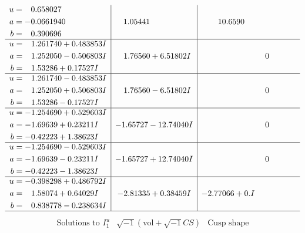 \documentclass[1p]{elsarticle_modified}
\theoremstyle{definition}
\newcommand{\I}{\sqrt{-1}}
\begin{document}
$$\begin{array}{c|c|c}
\begin{aligned}
u &= \phantom{-}0.658027\phantom{ +0.000000I} \\
a &= -0.0661940\phantom{ +0.000000I} \\
b &= \phantom{-}0.390696\phantom{ +0.000000I}\end{aligned}
 & \phantom{-}1.05441\phantom{ +0.000000I} & \phantom{-}10.6590\phantom{ +0.000000I} \\ \hline\begin{aligned}
u &= \phantom{-}1.261740 + 0.483853 I \\
a &= \phantom{-}1.252050 - 0.506803 I \\
b &= \phantom{-}1.53286 + 0.17527 I\end{aligned}
 & \phantom{-}1.76560 + 6.51802 I & \phantom{-0.000000 } 0 \\ \hline\begin{aligned}
u &= \phantom{-}1.261740 - 0.483853 I \\
a &= \phantom{-}1.252050 + 0.506803 I \\
b &= \phantom{-}1.53286 - 0.17527 I\end{aligned}
 & \phantom{-}1.76560 - 6.51802 I & \phantom{-0.000000 } 0 \\ \hline\begin{aligned}
u &= -1.254690 + 0.529603 I \\
a &= -1.69639 + 0.23211 I \\
b &= -0.42223 + 1.38623 I\end{aligned}
 & -1.65727 - 12.74040 I & \phantom{-0.000000 } 0 \\ \hline\begin{aligned}
u &= -1.254690 - 0.529603 I \\
a &= -1.69639 - 0.23211 I \\
b &= -0.42223 - 1.38623 I\end{aligned}
 & -1.65727 + 12.74040 I & \phantom{-0.000000 } 0 \\ \hline\begin{aligned}
u &= -0.398298 + 0.486792 I \\
a &= \phantom{-}1.58074 + 0.64029 I \\
b &= \phantom{-}0.838778 - 0.238634 I\end{aligned}
 & -2.81335 + 0.38459 I & -2.77066 + 0. I\phantom{ +0.000000I}\\
 \hline 
 \end{array}$$\newpage$$\begin{array}{c|c|c}  
\text{Solutions to }I^u_{1}& \I (\text{vol} + \sqrt{-1}CS) & \text{Cusp shape}\\

\end{array}$$
\end{document}
